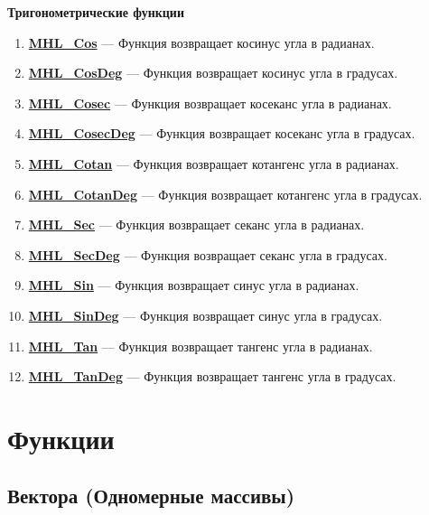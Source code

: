 \documentclass[a4paper,12pt]{article}
\begin{document}
\textbf{Тригонометрические функции}
\begin{enumerate}

\item \textbf{\hyperref[MHL_Cos]{MHL\_Cos}} --- Функция возвращает косинус угла в радианах.

\item \textbf{\hyperref[MHL_CosDeg]{MHL\_CosDeg}} --- Функция возвращает косинус угла в градусах.

\item \textbf{\hyperref[MHL_Cosec]{MHL\_Cosec}} --- Функция возвращает косеканс угла в радианах.

\item \textbf{\hyperref[MHL_CosecDeg]{MHL\_CosecDeg}} --- Функция возвращает косеканс угла в градусах.

\item \textbf{\hyperref[MHL_Cotan]{MHL\_Cotan}} --- Функция возвращает котангенс угла в радианах.

\item \textbf{\hyperref[MHL_CotanDeg]{MHL\_CotanDeg}} --- Функция возвращает котангенс угла в градусах.

\item \textbf{\hyperref[MHL_Sec]{MHL\_Sec}} --- Функция возвращает секанс угла в радианах.

\item \textbf{\hyperref[MHL_SecDeg]{MHL\_SecDeg}} --- Функция возвращает секанс угла в градусах.

\item \textbf{\hyperref[MHL_Sin]{MHL\_Sin}} --- Функция возвращает синус угла в радианах.

\item \textbf{\hyperref[MHL_SinDeg]{MHL\_SinDeg}} --- Функция возвращает синус угла в градусах.

\item \textbf{\hyperref[MHL_Tan]{MHL\_Tan}} --- Функция возвращает тангенс угла в радианах.

\item \textbf{\hyperref[MHL_TanDeg]{MHL\_TanDeg}} --- Функция возвращает тангенс угла в градусах.

\end{enumerate}


\newpage
\section{Функции}
\subsection{Вектора (Одномерные массивы)}
\end{document}
